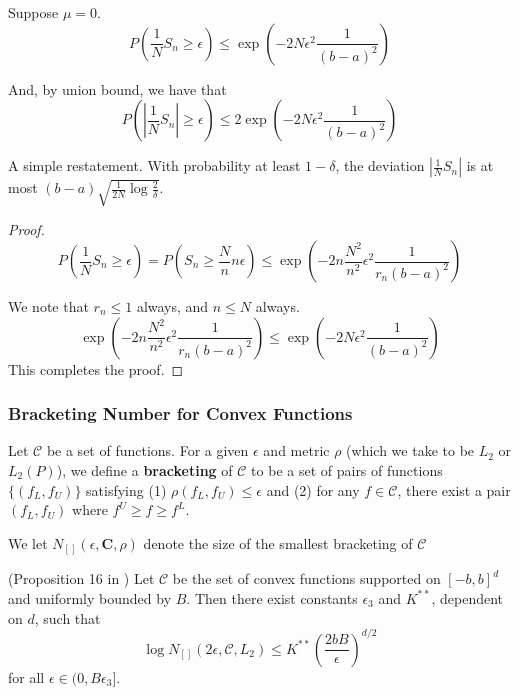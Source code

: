 \begin{corollary}
\label{cor:serfling}
Suppose $\mu = 0$. 
\[
P( \frac{1}{N} S_n \geq \epsilon) \leq \exp( -2 N \epsilon^2 \frac{1}{(b-a)^2})
\]

And, by union bound, we have that
\[
P( | \frac{1}{N} S_n| \geq \epsilon) \leq 2 \exp( -2 N \epsilon^2 \frac{1}{(b-a)^2})
\]

\end{corollary}

A simple restatement. With probability at least $1- \delta$, the deviation $| \frac{1}{N} S_n|$ is at most $ (b-a) \sqrt{ \frac{1}{2N} \log \frac{2}{\delta}}$.

\begin{proof}
\[
P( \frac{1}{N} S_n \geq \epsilon) = P( S_n \geq \frac{N}{n} n \epsilon) \leq \exp( - 2 n \frac{N^2}{n^2} \epsilon^2 \frac{1}{r_n (b-a)^2} ) 
\]

We note that $r_n \leq 1$ always, and $n \leq N$ always. 
\[
\exp( - 2 n \frac{N^2}{n^2} \epsilon^2 \frac{1}{r_n (b-a)^2} )  \leq \exp( - 2 N \epsilon^2 \frac{1}{(b-a)^2})
\]
This completes the proof.

\end{proof}

\subsubsection{Bracketing Number for Convex Functions}

\begin{definition}
Let $\mathcal{C}$ be a set of functions. For a given $\epsilon$ and metric $\rho$ (which we take to be $L_2$ or $L_2(P)$), we define a \textbf{bracketing} of $\mathcal{C}$ to be a set of pairs of functions $\{ (f_L, f_U) \}$ satisfying (1) $\rho( f_L, f_U) \leq \epsilon$ and (2) for any $f \in \mathcal{C}$, there exist a pair $(f_L, f_U)$ where $f^U \geq f \geq f^L$. 

We let $N_{[]}(\epsilon, \mathbf{C}, \rho)$ denote the size of the smallest bracketing of $\mathcal{C}$
\end{definition}

\begin{proposition} (Proposition 16 in \cite{kim2014global})
\label{prop:convexbracket}
Let $\mathcal{C}$ be the set of convex functions supported on $[-b, b]^d$ and uniformly bounded by $B$. Then there exist constants $\epsilon_3$ and $K^{**}$, dependent on $d$, such that
\[
\log N_{[]} (2\epsilon, \mathcal{C}, L_2) \leq K^{**} \left( \frac{2bB}{\epsilon} \right)^{d/2}
\]
for all $\epsilon \in (0, B \epsilon_3]$.
\end{proposition}

